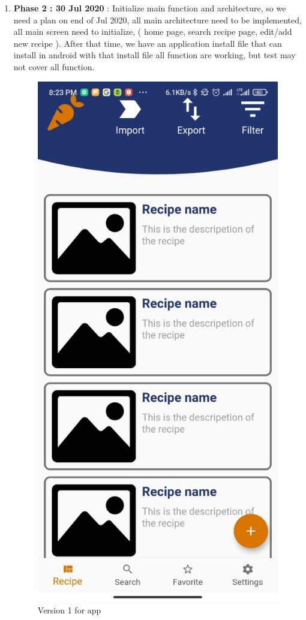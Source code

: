 \documentclass{article}
\begin{document}
\begin{enumerate}
        \item \textbf{Phase 2 : 30 Jul 2020} : Initialize main function and architecture, so we need a plan on end of Jul 2020, all main architecture need to be implemented, all main screen need to initialize, ( home page, search recipe page, edit/add new recipe ). After that time, we have an application install file that can install in android with that install file all function are working, but test may not cover all function.\\
        \begin{figure}[h!]
        \centering
        \includegraphics[scale=0.1]{Images/CookingBook.jpg}
        \caption{Version 1 for app}
        \label{fig:cookingbook}
        \end{figure}


\end{enumerate}
\end{document}
